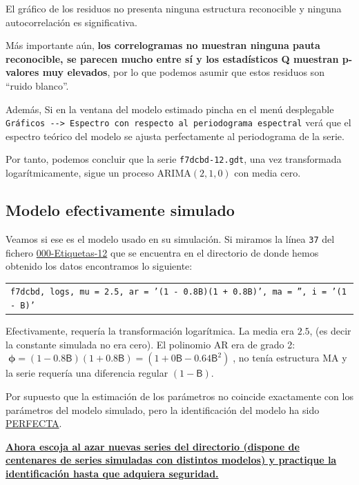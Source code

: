 \documentclass[10pt]{article}
\begin{document}
El gráfico de los residuos no presenta ninguna estructura reconocible y ninguna autocorrelación es significativa. 

Más importante aún, \textbf{los correlogramas no muestran ninguna pauta
reconocible, se parecen mucho entre sí y los estadísticos Q muestran
p-valores muy elevados}, por lo que podemos asumir que estos residuos
son ``ruido blanco''.
\medskip

Además, Si en la ventana del modelo estimado pincha en el menú
desplegable \texttt{Gráficos -{}-{}> Espectro con respecto al periodograma
espectral} verá que el espectro teórico del modelo se ajusta
perfectamente al periodograma de la serie.
\medskip

Por tanto, podemos concluir que la serie \texttt{f7dcbd-12.gdt}, una vez
transformada logarítmicamente, sigue un proceso ARIMA\((2,1,0)\) con
media cero. 
\subsection*{Modelo efectivamente simulado}
\label{sec:orge741fd9}

Veamos si ese es el modelo usado en su simulación. Si miramos la línea
\texttt{37} del fichero \href{IdentificaEstosARIMA/000-Etiquetas-12}{000-Etiquetas-12} que se encuentra en el directorio de
donde hemos obtenido los datos encontramos lo siguiente:
\medskip

\begin{center}
\begin{tabular}{l}
\texttt{f7dcbd,	logs,	mu = 2.5,	ar = '(1 - 0.8B)(1 + 0.8B)', ma = '', i = '(1 - B)'}\\
\end{tabular}
\end{center}

\medskip

Efectivamente, requería la transformación logarítmica. La media era
\(2.5\), (es decir la constante simulada no era cero). El polinomio AR
era de grado 2: \(\;\boldsymbol{\phi}=(1 - 0.8\mathsf{B})(1 +
0.8\mathsf{B})=(1+0\mathsf{B}-0.64\mathsf{B}^2)\;\), no tenía
estructura MA y la serie requería una diferencia regular \((1 -
\mathsf{B})\).
\bigskip

Por supuesto que la estimación de los parámetros no coincide
exactamente con los parámetros del modelo simulado, pero la
identificación del modelo ha sido \uline{PERFECTA}.
\bigskip


\textbf{\uline{Ahora escoja al azar nuevas series del \href{https://github.com/mbujosab/EconometriaAplicada-SRC/tree/main/Ejercicios/IdentificaEstosARIMA}{directorio} (dispone de
 centenares de series simuladas con distintos modelos) y practique la
 identificación hasta que adquiera seguridad.}}
\end{document}
